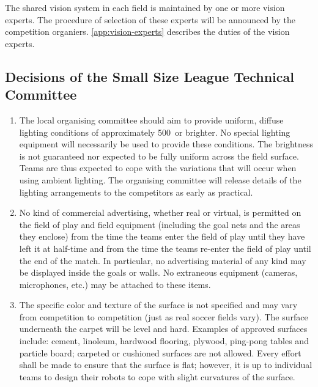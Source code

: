 The shared vision system in each field is maintained by one or more vision experts.
The procedure of selection of these experts will be announced by the competition organiers.
\autoref{app:vision-experts} describes the duties of the vision experts.

\subsection*{Decisions of the Small Size League Technical Committee}
\begin{enumerate}
\item
The local organising committee should aim to provide uniform, diffuse lighting conditions of approximately 500\, or brighter.
No special lighting equipment will necessarily be used to provide these conditions.
The brightness is not guaranteed nor expected to be fully uniform across the field surface.
Teams are thus expected to cope with the variations that will occur when using ambient lighting.
The organising committee will release details of the lighting arrangements to the competitors as early as practical.

\item
No kind of commercial advertising, whether real or virtual, is permitted on the field of play and field equipment (including the goal nets and the areas they enclose) from the time the teams enter the field of play until they have left it at half-time and from the time the teams re-enter the field of play until the end of the match.
In particular, no advertising material of any kind may be displayed inside the goals or walls.
No extraneous equipment (cameras, microphones, etc.) may be attached to these items.

\item
The specific color and texture of the surface is not specified and may vary from competition to competition (just as real soccer fields vary).
The surface underneath the carpet will be level and hard.
Examples of approved surfaces include: cement, linoleum, hardwood flooring, plywood, ping-pong tables and particle board; carpeted or cushioned surfaces are not allowed.
Every effort shall be made to ensure that the surface is flat; however, it is up to individual teams to design their robots to cope with slight curvatures of the surface.
\end{enumerate}
